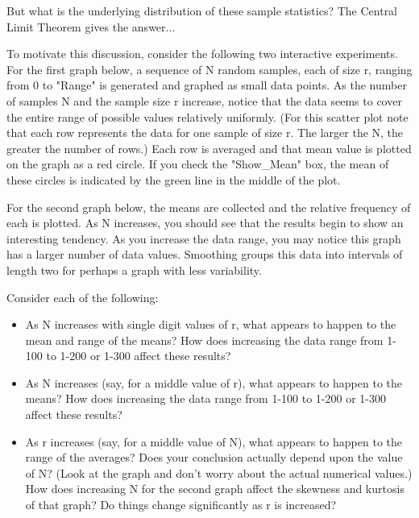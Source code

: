 \documentclass[10pt,]{book}
\theoremstyle{plain}
\theoremstyle{definition}
\theoremstyle{definition}
\theoremstyle{definition}
\numberwithin{equation}{section}
\begin{document}
But what is the underlying distribution of these sample statistics?  The Central Limit Theorem gives the answer...%
\par
To motivate this discussion, consider the following two interactive experiments.  For the first graph below, a sequence of N random samples, each of size r, ranging from 0 to "Range" is generated and graphed as small data points.  As the number of samples N and the sample size r increase, notice that the data seems to cover the entire range of possible values relatively uniformly.  (For this scatter plot note that each row represents the data for one sample of size r.  The larger the N, the greater the number of rows.)  Each row is averaged and that mean value is plotted on the graph as a red circle.  If you check the "Show_Mean" box, the mean of these circles is indicated by the green line in the middle of the plot.
%
\par

For the second graph below, the means are collected and the relative frequency of each is plotted.  As N increases, you should see that the results begin to show an interesting tendency.   As you increase the data range, you may notice this graph has a larger number of data values.  Smoothing groups this data into intervals of length two for perhaps a graph with less variability.
%
\par

Consider each of the following:
\leavevmode%
\begin{itemize}[label=\textbullet]
\item{}
As N increases with single digit values of r, what appears to happen to the mean and range of the means?  How does increasing the data range from 1-100 to 1-200 or 1-300 affect these results?%
\item{}As N increases (say, for a middle value of r), what appears to happen to the means?  How does increasing the data range from 1-100 to 1-200 or 1-300 affect these results?%
\item{}As r increases (say, for a middle value of N), what appears to happen to the range of the averages?  Does your conclusion actually depend upon the value of N?  (Look at the graph and don't worry about the actual numerical values.)
How does increasing N for the second graph affect the skewness and kurtosis of that graph?  Do things change significantly as r is increased?  %
\end{itemize}
\end{document}
